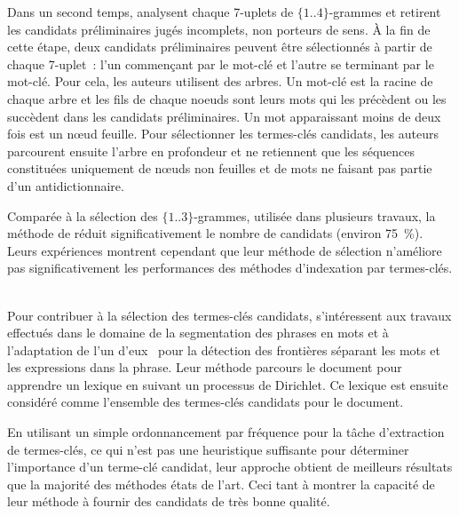     Dans un second temps,  analysent chaque
    7-uplets de $\{1..4\}$-grammes et retirent les candidats préliminaires jugés
    incomplets, non porteurs de sens. À la fin de cette étape, deux candidats
    préliminaires peuvent être sélectionnés à partir de chaque 7-uplet~: l'un
    commençant par le mot-clé et l'autre se terminant par le mot-clé. Pour cela,
    les auteurs utilisent des arbres. Un mot-clé est la racine de
    chaque arbre et les fils de chaque noeuds sont leurs mots qui les précèdent
    ou les succèdent dans les candidats préliminaires. Un mot apparaissant moins
    de deux fois est un
    n\oe{}ud feuille. Pour sélectionner les termes-clés candidats, les auteurs
    parcourent ensuite l'arbre en profondeur et ne retiennent que les
    séquences constituées uniquement de n\oe{}uds non feuilles et de mots ne
    faisant pas partie d'un antidictionnaire.


    Comparée à la sélection des $\{1..3\}$-grammes, utilisée dans plusieurs
    travaux, la méthode de  réduit
    significativement le nombre de candidats (environ 75~\%). Leurs expériences
    montrent cependant que leur méthode de sélection n'améliore pas
    significativement les performances des méthodes d'indexation par
    termes-clés.

    ~\\Pour contribuer à la sélection des termes-clés candidats,
     s'intéressent aux travaux
    effectués dans le domaine de la segmentation des phrases en mots et à
    l'adaptation de l'un d'eux~\cite{goldwater2009bayesianwordsegmentation} pour
    la détection des frontières séparant les mots et les expressions dans la
    phrase. Leur méthode parcours le document pour apprendre un lexique en
    suivant un processus de Dirichlet. Ce lexique est ensuite considéré comme
    l'ensemble des termes-clés candidats pour le document.

    En utilisant un simple ordonnancement par fréquence pour la tâche
    d'extraction de termes-clés, ce qui n'est pas une heuristique suffisante
    pour déterminer l'importance d'un terme-clé candidat, leur approche obtient
    de meilleurs résultats que la majorité des méthodes états de l'art. Ceci
    tant à montrer la capacité de leur méthode à fournir des candidats de très
    bonne qualité.

